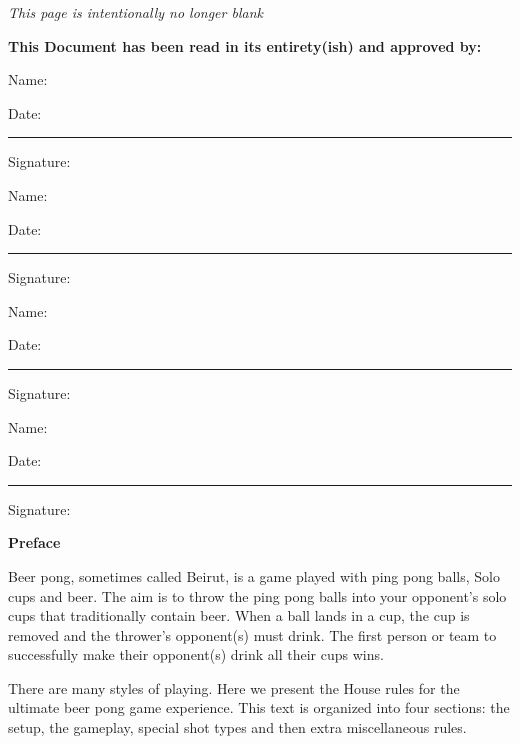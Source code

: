 \documentclass[11pt, oneside,letterpaper]{article}
\begin{document}


\newpage\thispagestyle{empty}
\emph{This page is intentionally no longer blank}

\newpage\thispagestyle{empty}
\textbf{This Document has been read in its entirety(ish) and approved by: }

\vspace{1.5cm}
\noindent Name: \hrulefill

\vspace{1cm}
\noindent Date: \rule{1.5in}{0.5pt} Signature: \hrulefill 

\vspace{1.5cm}
\noindent Name: \hrulefill

\vspace{1cm}
\noindent Date: \rule{1.5in}{0.5pt} Signature: \hrulefill

\vspace{1.5cm}
\noindent Name: \hrulefill 

\vspace{1cm}
\noindent Date: \rule{1.5in}{0.5pt} Signature: \hrulefill

\vspace{1.5cm}
\noindent Name: \hrulefill

\vspace{1cm}
\noindent Date: \rule{1.5in}{0.5pt} Signature: \hrulefill 

\newpage\thispagestyle{empty}
\tableofcontents \thispagestyle{empty}
\newpage

\setcounter{page}{1} %
\begin{center}
    \textbf{Preface}
\end{center}
    Beer pong, sometimes called Beirut, is a game played with ping pong balls, Solo cups and beer.
    The aim is to throw the ping pong balls into your opponent's solo cups that traditionally contain beer.
    When a ball lands in a cup, the cup is removed and the thrower's opponent(s) must drink.
    The first person or team to successfully make their opponent(s) drink all their cups wins.

    There are many styles of playing.
    Here we present the House rules for the ultimate beer pong game experience. 
    This text is organized into four sections: the setup, the gameplay, special shot types and then extra miscellaneous rules.







\end{document}
